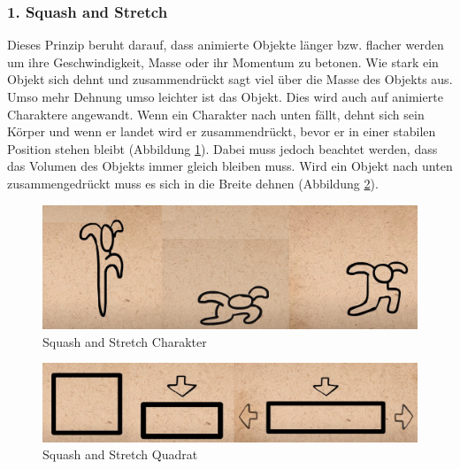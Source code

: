 \subsubsection{1. Squash and Stretch}
Dieses Prinzip beruht darauf, dass animierte Objekte länger bzw. flacher werden um ihre Geschwindigkeit, Masse oder ihr Momentum zu betonen.
Wie stark ein Objekt sich dehnt und zusammendrückt sagt viel über die Masse des Objekts aus. Umso mehr Dehnung umso leichter ist das Objekt.
Dies wird auch auf animierte Charaktere angewandt. Wenn ein Charakter nach unten fällt, dehnt sich sein Körper und wenn er landet wird er zusammendrückt, bevor er in einer stabilen Position stehen bleibt (Abbildung \ref{fig:tech:SqashAndStretch}).
Dabei muss jedoch beachtet werden, dass das Volumen des Objekts immer gleich bleiben muss. Wird ein Objekt nach unten zusammengedrückt muss es sich in die Breite dehnen (Abbildung \ref{fig:tech:SqashAndStretchCube}).
\begin{figure}[H]
    \centering
    \includegraphics[scale=0.5]{pics/SqashAndStretch.png}
    \caption{Squash and Stretch Charakter}
    \label{fig:tech:SqashAndStretch}
\end{figure}

\begin{figure}[H]
    \centering
    \includegraphics[scale=0.5]{pics/SqashAndStretchCube.png}
    \caption{Squash and Stretch Quadrat}
    \label{fig:tech:SqashAndStretchCube}
\end{figure}

